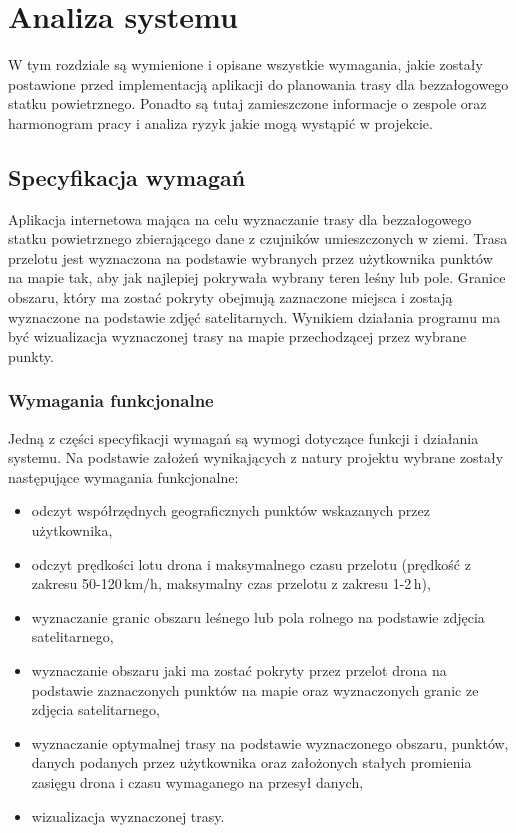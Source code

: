 \chapter{Analiza systemu}
\label{chap:system analysis}

W tym rozdziale są wymienione i opisane wszystkie wymagania, jakie zostały postawione przed implementacją aplikacji do planowania trasy dla bezzałogowego statku powietrznego. Ponadto są tutaj zamieszczone informacje o zespole oraz harmonogram pracy i analiza ryzyk jakie mogą wystąpić w projekcie.

\section{Specyfikacja wymagań}

Aplikacja internetowa mająca na celu wyznaczanie trasy dla bezzałogowego statku powietrznego zbierającego dane z czujników umieszczonych w ziemi. Trasa przelotu jest wyznaczona na podstawie wybranych przez użytkownika punktów na mapie tak, aby jak najlepiej pokrywała wybrany teren leśny lub pole. Granice obszaru, który ma zostać pokryty obejmują zaznaczone miejsca i zostają wyznaczone na podstawie zdjęć satelitarnych. Wynikiem działania programu ma być wizualizacja wyznaczonej trasy na mapie przechodzącej przez wybrane punkty.

\subsection{Wymagania funkcjonalne}
Jedną z części specyfikacji wymagań są wymogi dotyczące funkcji i działania systemu. Na podstawie założeń wynikających z natury projektu wybrane zostały następujące wymagania funkcjonalne: 
\begin{itemize}
    \item odczyt współrzędnych geograficznych punktów wskazanych przez użytkownika,
    \item odczyt prędkości lotu drona i maksymalnego czasu przelotu (prędkość z zakresu 50-120\,km/h, maksymalny czas przelotu z zakresu 1-2\,h),
    \item wyznaczanie granic obszaru leśnego lub pola rolnego na podstawie zdjęcia satelitarnego,
    \item wyznaczanie obszaru jaki ma zostać pokryty przez przelot drona na podstawie zaznaczonych punktów na mapie oraz wyznaczonych granic ze zdjęcia satelitarnego,
    \item wyznaczanie optymalnej trasy na podstawie wyznaczonego obszaru, punktów, danych podanych przez użytkownika oraz założonych stałych promienia zasięgu drona i czasu wymaganego na przesył danych,
    \item wizualizacja wyznaczonej trasy.
\end{itemize}

